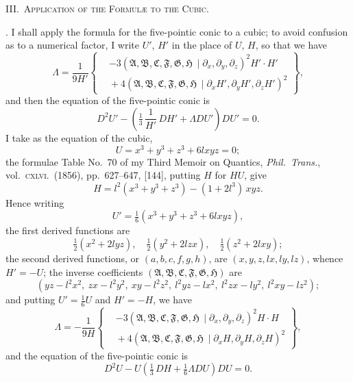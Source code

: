 \documentclass[11pt]{article}
\newcommand{\Cdel}{\mid}
\begin{document}
\bigskip

\begin{center}
\textsc{III.\ Application of the Formul\ae{} to the Cubic.}
\end{center}

\medskip

. I shall apply the formula for the five-pointic conic to a cubic; to avoid confusion as to a numerical factor, I write $U'$, $H'$ in the place of $U$, $H$, so that we have
\[
\Lambda = \frac{1}{9H'}\!\left\{
\begin{aligned}
&-3(\mathfrak{A}, \mathfrak{B}, \mathfrak{C}, \mathfrak{F}, \mathfrak{G}, \mathfrak{H}\,\Cdel\partial_x, \partial_y, \partial_z)^2 H' \cdot H'\\
&{}+ 4(\mathfrak{A}, \mathfrak{B}, \mathfrak{C}, \mathfrak{F}, \mathfrak{G}, \mathfrak{H}\,\Cdel\partial_x H', \partial_y H', \partial_z H')^2
\end{aligned}
\right\},
\]
and then the equation of the five-pointic conic is
\[
D^2 U' - \!\left(\tfrac{1}{3}\,\frac{1}{H'}\,DH' + \Lambda DU'\right)\!DU' = 0.
\]
I take as the equation of the cubic,
\[
U = x^3 + y^3 + z^3 + 6lxyz = 0;
\]
the formulae Table No.~70 of my Third Memoir on Quantics, \textit{Phil.\ Trans.}, vol.~\textsc{cxlvi}.\ (1856), pp.~627--647, [144], putting $H$ for $HU$, give
\[
H = l^2(x^3 + y^3 + z^3) - (1 + 2l^3)\,xyz.
\]
Hence writing
\[
U' = \tfrac{1}{6}(x^3 + y^3 + z^3 + 6lxyz),
\]
the first derived functions are
\[
\tfrac{1}{2}(x^2 + 2lyz),\quad \tfrac{1}{2}(y^2 + 2lzx),\quad \tfrac{1}{2}(z^2 + 2lxy);
\]
the second derived functions, or $(a, b, c, f, g, h)$, are $(x, y, z, lx, ly, lz)$, whence $H' = -U$; the inverse coefficients $(\mathfrak{A}, \mathfrak{B}, \mathfrak{C}, \mathfrak{F}, \mathfrak{G}, \mathfrak{H})$ are
\[
(yz - l^2 x^2,\ zx - l^2 y^2,\ xy - l^2 z^2,\ l^2 yz - lx^2,\ l^2 zx - ly^2,\ l^2 xy - lz^2);
\]
and putting $U' = \tfrac{1}{6}U$ and $H' = -H$, we have
\[
\Lambda = -\frac{1}{9H}\!\left\{
\begin{aligned}
&-3(\mathfrak{A}, \mathfrak{B}, \mathfrak{C}, \mathfrak{F}, \mathfrak{G}, \mathfrak{H}\,\Cdel\partial_x, \partial_y, \partial_z)^2 H \cdot H\\
&{}+ 4(\mathfrak{A}, \mathfrak{B}, \mathfrak{C}, \mathfrak{F}, \mathfrak{G}, \mathfrak{H}\,\Cdel\partial_x H, \partial_y H, \partial_z H)^2
\end{aligned}
\right\},
\]
and the equation of the five-pointic conic is
\[
D^2 U - U\!\left(\tfrac{1}{3}\,DH + \tfrac{1}{6}\Lambda DU\right)\!DU = 0.
\]
\end{document}
